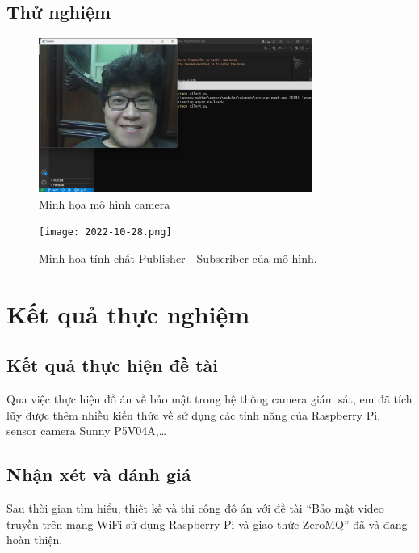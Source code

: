 \documentclass{article}
\begin{document}
\subsection{Thử nghiệm}

\vfill

\begin{figure}[H]
    \centering
    \includegraphics[width=0.8\textwidth]{demonstration.png}
    \caption{Minh họa mô hình camera}
    \label{demonstration}
\end{figure}

\vfill

\begin{figure}[H]
    \centering
    \texttt{[image: 2022-10-28.png]}
    \caption{Minh họa tính chất Publisher - Subscriber của mô hình.}
    \label{demonstration2}
\end{figure}

\newpage

\section{Kết quả thực nghiệm}

\subsection{Kết quả thực hiện đề tài}
Qua việc thực hiện đồ án về bảo mật trong hệ thống camera giám sát, em đã tích lũy được thêm nhiều kiến thức về sử dụng các tính năng của Raspberry Pi, sensor camera Sunny P5V04A,…

\subsection{Nhận xét và đánh giá}

Sau thời gian tìm hiểu, thiết kế và thi công đồ án với đề tài “Bảo mật video truyền trên mạng WiFi sử dụng Raspberry Pi và giao thức ZeroMQ” đã và đang hoàn thiện.
\end{document}
